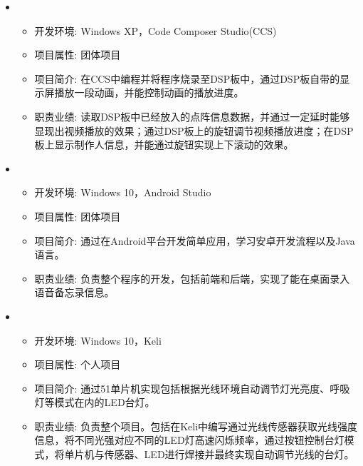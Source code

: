 \begin{itemize}[leftmargin=*]
        \iffalse
    \item
      {\small
      \begin{itemize}
        \item 开发环境: Windows XP，Code Composer Studio(CCS)
        \item 项目属性: 团体项目
        \item 项目简介: 在CCS中编程并将程序烧录至DSP板中，通过DSP板自带的显示屏播放一段动画，并能控制动画的播放进度。
        \item 职责业绩: 读取DSP板中已经放入的点阵信息数据，并通过一定延时能够显现出视频播放的效果；通过DSP板上的旋钮调节视频播放进度；在DSP板上显示制作人信息，并能通过旋钮实现上下滚动的效果。
      \end{itemize}
      }
    \item
      {\small
      \begin{itemize}
        \item 开发环境: Windows 10，Android Studio
        \item 项目属性: 团体项目
        \item 项目简介: 通过在Android平台开发简单应用，学习安卓开发流程以及Java语言。
        \item 职责业绩: 负责整个程序的开发，包括前端和后端，实现了能在桌面录入语音备忘录信息。
      \end{itemize}
      }
    \item
      {\small
      \begin{itemize}
        \item 开发环境: Windows 10，Keli
        \item 项目属性: 个人项目
        \item 项目简介: 通过51单片机实现包括根据光线环境自动调节灯光亮度、呼吸灯等模式在内的LED台灯。
        \item 职责业绩: 负责整个项目。包括在Keli中编写通过光线传感器获取光线强度信息，将不同光强对应不同的LED灯高速闪烁频率，通过按钮控制台灯模式，将单片机与传感器、LED进行焊接并最终实现自动调节光线的台灯。

\end{itemize}}
\end{itemize}
